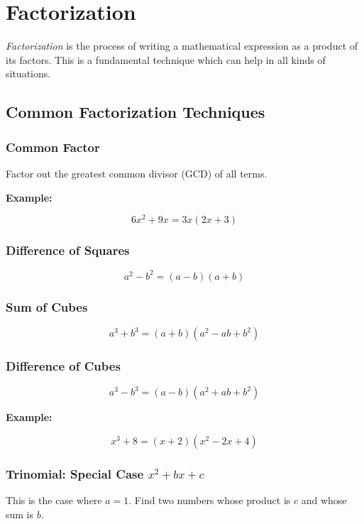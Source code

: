 \chapter{Factorization}

\emph{Factorization} is the process of writing a mathematical expression as a product of its factors. 
This is a fundamental technique which can help in all kinds of situations.

\section{Common Factorization Techniques}

\subsection{Common Factor}

Factor out the greatest common divisor (GCD) of all terms.

\textbf{Example:}

\[
    6x^2 + 9x = 3x(2x + 3)
\]

\subsection{Difference of Squares}

\[
    a^2 - b^2 = (a - b)(a + b)
\]

\subsection{Sum of Cubes}

\[
    a^3 + b^3 = (a + b)(a^2 - ab + b^2)
\]

\subsection{Difference of Cubes}

\[
    a^3 - b^3 = (a - b)(a^2 + ab + b^2)
\]

\textbf{Example:}

\[
    x^3 + 8 = (x + 2)(x^2 - 2x + 4)
\]

\subsection{Trinomial: Special Case \texorpdfstring{\(x^2 + bx + c\)}{x² + bx + c}}

This is the case where \(a = 1\). Find two numbers whose product is \(c\) and whose sum is \(b\).


